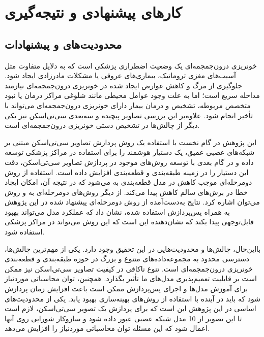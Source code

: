 \chapter{کارهای پیشنهادی و نتیجه‌گیری}
\section{محدودیت‌های و پیشنهادات}
خونریزی درون‌جمجمه‌ای یک وضعیت اضطراری پزشکی است که به دلایل متفاوت مثل آسیب‌های مغزی تروماتیک، بیماری‌های عروقی یا مشکلات مادرزادی ایجاد شود\cite{monica2022detection}.
جلوگیری از مرگ و کاهش عوارض ایجاد شده در خونریزی درون‌جمجمه‌ای نیازمند مداخله سریع است؛ اما به علت وجود عوامل محیطی مانند شلوغی مراکز درمان یا نبود متخصص مربوطه، تشخیص و درمان بیمار دارای خونریزی درون‌جمجمه‌ای می‌تواند با تأخیر انجام شود. علاوه‌بر این بررسی تصاویر پیچیده و سه‌بعدی سی‌تی‌اسکن نیز یکی دیگر از چالش‌ها در تشخیص دستی خونریزی درون‌جمجمه‌ای است.

این پژوهش در گام نخست با استفاده یک روش پردازش تصاویر سی‌تی‌اسکن مبتنی بر شبکه‌های عصبی عمیق،‌ یک دستیار هوشمند را برای استفاده در مراکز پزشکی توسعه داده و در گام بعدی با توسعه روش‌های موجود در پردازش تصاویر سی‌تی‌اسکن، دقت این دستیار را در زمینه طبقه‌بندی و قطعه‌بندی افزایش داده است.
استفاده از روش دومرحله‌ای موجب کاهش
در مدل قطعه‌بندی به 
می‌شود که در نتیجه آن، امکان ایجاد خطا در برش‌‌های سالم کاهش پیدا می‌کند. از دیگر روش‌های دومرحله‌ای به 
و روش
می‌توان اشاره کرد.
 نتایج به‌دست‌آمده از روش دومرحله‌ای پیشنهاد شده در این پژوهش به همراه پس‌پردازش استفاده شده،‌ نشان داد که عملکرد مدل می‌تواند بهبود قابل‌توجهی پیدا بکند که نشان‌دهنده این است که این روش می‌تواند در مراکز پزشکی استفاده شود.

بااین‌حال، چالش‌ها و محدودیت‌هایی در این تحقیق وجود دارد. یکی از مهم‌ترین چالش‌ها، دسترسی محدود به مجموعه‌داده‌های متنوع و بزرگ در حوزه طبقه‌بندی و قطعه‌بندی خونریزی درون‌جمجمه‌ای است. تنوع ناکافی در کیفیت تصاویر سی‌تی‌اسکن نیز ممکن است بر قابلیت تعمیم‌پذیری مدل‌های ما تأثیر بگذارد. همچنین، توان محاسباتی موردنیاز برای آموزش مدل‌ها و اجرای پس‌پردازش ممکن است باعث افزایش زمان پردازش شود که باید در آینده با استفاده از روش‌های بهینه‌سازی بهبود یابد.
یکی از محدودیت‌های اساسی در این پژوهش این است که برای پردازش یک تصویر سی‌تی‌اسکن،‌ لازم است تا این تصویر از 10 مدل شبکه عصبی عبور داده شود و سازوکار شورایی روی آنها اعمال شود که این مسئله توان محاسباتی موردنیاز را افزایش می‌دهد.

